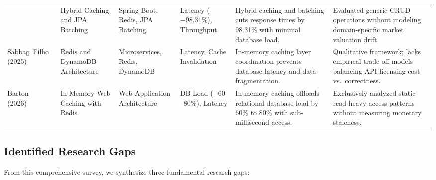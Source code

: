 \documentclass[11pt,a4paper]{article}
\begin{document}
\begin{table}[htbp]
\begin{tabularx}{\textwidth}{p{2.2cm} p{2.8cm} p{2.2cm} p{1.8cm} X X}
  & Hybrid Caching and JPA Batching
  & Spring Boot, Redis, JPA Batching
  & Latency ($-98.31\%$), Throughput
  & Hybrid caching and batching cuts response times by 98.31\% with minimal database load.
  & Evaluated generic CRUD operations without modeling domain-specific market valuation drift. \\
\addlinespace
Sabbag~Filho (2025)~\cite{sabbag2025redis}
  & Redis and DynamoDB Architecture
  & Microservices, Redis, DynamoDB
  & Latency, Cache Invalidation
  & In-memory caching layer coordination prevents database latency and data fragmentation.
  & Qualitative framework; lacks empirical trade-off models balancing API licensing cost vs.\ correctness. \\
\addlinespace
Barton (2026)~\cite{barton2026}
  & In-Memory Web Caching with Redis
  & Web Application Architecture
  & DB Load ($-60$--$80\%$), Latency
  & In-memory caching offloads relational database load by 60\% to 80\% with sub-millisecond access.
  & Exclusively analyzed static read-heavy access patterns without measuring monetary staleness. \\
\bottomrule
\end{tabularx}
\end{table}

\subsection{Identified Research Gaps}

From this comprehensive survey, we synthesize three fundamental research gaps:
\end{document}
